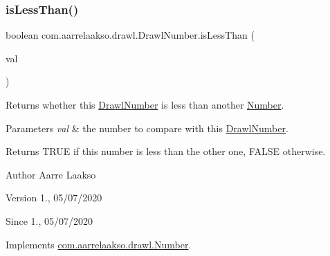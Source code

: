 \subsubsection{\texorpdfstring{is\+Less\+Than()}{isLessThan()}\hspace{0.1cm}{\footnotesize\ttfamily [1/2]}}
{\footnotesize\ttfamily boolean com.\+aarrelaakso.\+drawl.\+Drawl\+Number.\+is\+Less\+Than (\begin{DoxyParamCaption}\item[{@Not\+Null final \hyperlink{interfacecom_1_1aarrelaakso_1_1drawl_1_1_number}{Number}}]{val }\end{DoxyParamCaption})}



Returns whether this \hyperlink{classcom_1_1aarrelaakso_1_1drawl_1_1_drawl_number}{Drawl\+Number} is less than another \hyperlink{interfacecom_1_1aarrelaakso_1_1drawl_1_1_number}{Number}. 


\begin{DoxyParams}{Parameters}
{\em val} & the number to compare with this \hyperlink{classcom_1_1aarrelaakso_1_1drawl_1_1_drawl_number}{Drawl\+Number}. \\
\hline
\end{DoxyParams}
\begin{DoxyReturn}{Returns}
{\ttfamily T\+R\+UE} if this number is less than the other one, {\ttfamily F\+A\+L\+SE} otherwise. 
\end{DoxyReturn}
\begin{DoxyAuthor}{Author}
Aarre Laakso 
\end{DoxyAuthor}
\begin{DoxyVersion}{Version}
1., 05/07/2020 
\end{DoxyVersion}
\begin{DoxySince}{Since}
1., 05/07/2020 
\end{DoxySince}


Implements \hyperlink{interfacecom_1_1aarrelaakso_1_1drawl_1_1_number_acc7fec3a209cb27e09a45f17ed9fd4e1}{com.\+aarrelaakso.\+drawl.\+Number}.

\mbox{\label{classcom_1_1aarrelaakso_1_1drawl_1_1_drawl_number_a01bc433270b27f6b50ea59fd0d5fcc90}} 
